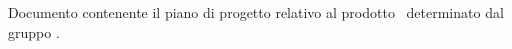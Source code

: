Documento contenente il piano di progetto relativo al prodotto \progetto\ determinato dal gruppo \gruppo.
